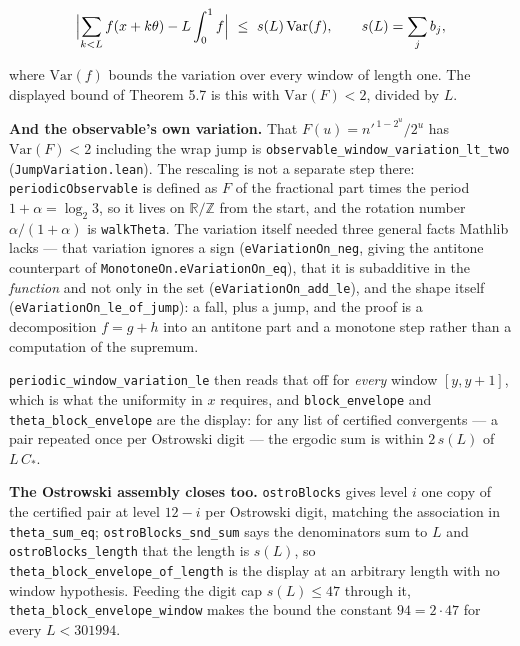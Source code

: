 \documentclass[12pt]{article}
\begin{document}
\[
\Bigl|\sum_{k<L}f(x+k\theta)-L\int_0^1f\Bigr|\ \le\ s(L)\,\mathrm{Var}(f),
\qquad s(L)=\sum_jb_j,
\]

where \(\mathrm{Var}(f)\) bounds the variation over every window of
length one. The displayed bound of Theorem 5.7 is this with
\(\mathrm{Var}(F)<2\), divided by \(L\).

\textbf{And the observable's own variation.} That
\(F(u)=n'^{\,1-2^u}/2^u\) has \(\mathrm{Var}(F)<2\) including the wrap
jump is \texttt{\nolinkurl{observable_window_variation_lt_two}}
(\texttt{\nolinkurl{JumpVariation.lean}}). The rescaling is not a
separate step there: \texttt{\nolinkurl{periodicObservable}} is defined
as \(F\) of the fractional part times the period \(1+\alpha=\log_2 3\),
so it lives on \(\mathbb R/\mathbb Z\) from the start, and the rotation
number \(\alpha/(1+\alpha)\) is \texttt{\nolinkurl{walkTheta}}. The
variation itself needed three general facts Mathlib lacks --- that
variation ignores a sign (\texttt{\nolinkurl{eVariationOn_neg}}, giving
the antitone counterpart of
\texttt{\nolinkurl{MonotoneOn.eVariationOn_eq}}), that it is subadditive
in the \emph{function} and not only in the set
(\texttt{\nolinkurl{eVariationOn_add_le}}), and the shape itself
(\texttt{\nolinkurl{eVariationOn_le_of_jump}}): a fall, plus a jump, and
the proof is a decomposition \(f=g+h\) into an antitone part and a
monotone step rather than a computation of the supremum.

\texttt{\nolinkurl{periodic_window_variation_le}} then reads that off
for \emph{every} window \([y,y+1]\), which is what the uniformity in
\(x\) requires, and \texttt{\nolinkurl{block_envelope}} and
\texttt{\nolinkurl{theta_block_envelope}} are the display: for any list
of certified convergents --- a pair repeated once per Ostrowski digit
--- the ergodic sum is within \(2\,s(L)\) of \(L\,C_*\).

\textbf{The Ostrowski assembly closes too.}
\texttt{\nolinkurl{ostroBlocks}} gives level \(i\) one copy of the
certified pair at level \(12-i\) per Ostrowski digit, matching the
association in \texttt{\nolinkurl{theta_sum_eq}};
\texttt{\nolinkurl{ostroBlocks_snd_sum}} says the denominators sum to
\(L\) and \texttt{\nolinkurl{ostroBlocks_length}} that the length is
\(s(L)\), so \texttt{\nolinkurl{theta_block_envelope_of_length}} is the
display at an arbitrary length with no window hypothesis. Feeding the
digit cap \(s(L)\le47\) through it,
\texttt{\nolinkurl{theta_block_envelope_window}} makes the bound the
constant \(94=2\cdot47\) for every \(L<301994\).
\end{document}
